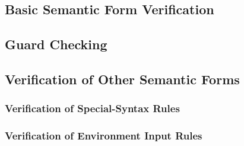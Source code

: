 
\subsection{Basic Semantic Form Verification} %
\label{sub:basic_semantic_form_verification}


\subsection{Guard Checking} %
\label{sub:guard_checking}


\subsection{Verification of Other Semantic Forms} %
\label{sub:verification_of_other_semantic_forms}

\subsubsection{Verification of Special-Syntax Rules} %
\label{ssub:verification_of_special_syntax_rules}


\subsubsection{Verification of Environment Input Rules} %
\label{ssub:verification_of_environment_input_rules}

